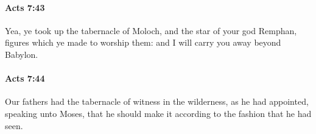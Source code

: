 		\paragraph{Acts 7:43} %
			\label{ACTS-7-43}

			Yea, ye took up the tabernacle of Moloch, and the star of your god Remphan, figures which ye made to worship them: and I will carry you away beyond Babylon.

			\begin{framed}
			\scriptsize
				\begin{compactdesc}
					\item[SBLG] 
				\end{compactdesc}
			\end{framed}

		\paragraph{Acts 7:44} %
			\label{ACTS-7-44}

			Our fathers had the tabernacle of witness in the wilderness, as he had appointed, speaking unto Moses, that he should make it according to the fashion that he had seen.

